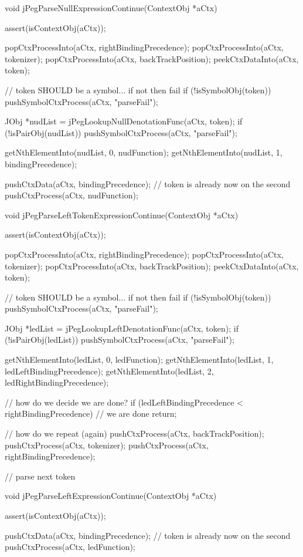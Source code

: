 \startCCode
void jPegParseNullExpressionContinue(ContextObj *aCtx) {
  assert(isContextObj(aCtx));
  
  popCtxProcessInto(aCtx, rightBindingPrecedence);
  popCtxProcessInto(aCtx, tokenizer);
  popCtxProcessInto(aCtx, backTrackPosition);
  peekCtxDataInto(aCtx, token);
  
  // token SHOULD be a symbol... if not then fail
  if (!isSymbolObj(token)) pushSymbolCtxProcess(aCtx, "parseFail");
  
  JObj *nudList = jPegLookupNullDenotationFunc(aCtx, token);
  if (!isPairObj(nudList)) pushSymbolCtxProcess(aCtx, "parseFail");
  
  getNthElementInto(nudList, 0, nudFunction);
  getNthElementInto(nudList, 1, bindingPrecedence);
  
  pushCtxData(aCtx, bindingPrecedence);
  // token is already now on the second
  pushCtxProcess(aCtx, nudFunction);
}

void jPegParseLeftTokenExpressionContinue(ContextObj *aCtx) {
  assert(isContextObj(aCtx));
  
  popCtxProcessInto(aCtx, rightBindingPrecedence);
  popCtxProcessInto(aCtx, tokenizer);
  popCtxProcessInto(aCtx, backTrackPosition);
  peekCtxDataInto(aCtx, token);
  
  // token SHOULD be a symbol... if not then fail
  if (!isSymbolObj(token)) pushSymbolCtxProcess(aCtx, "parseFail");
  
  JObj *ledList = jPegLookupLeftDenotationFunc(aCtx, token);
  if (!isPairObj(ledList)) pushSymbolCtxProcess(aCtx, "parseFail");
  
  getNthElementInto(ledList, 0, ledFunction);
  getNthElementInto(ledList, 1, ledLeftBindingPrecedence);
  getNthElementInto(ledList, 2, ledRightBindingPrecedence);
  
  // how do we decide we are done?
  if (ledLeftBindingPrecedence < rightBindingPrecedence) {
    // we are done
    return;
  }
  
  // how do we repeat (again)
  pushCtxProcess(aCtx, backTrackPosition);
  pushCtxProcess(aCtx, tokenizer);
  pushCtxProcess(aCtx, rightBindingPrecedence);

  // parse next token
  
}

void jPegParseLeftExpressionContinue(ContextObj *aCtx) {
  assert(isContextObj(aCtx));
  
  pushCtxData(aCtx, bindingPrecedence);
  // token is already now on the second
  pushCtxProcess(aCtx, ledFunction);

}

